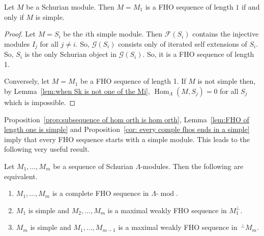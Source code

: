 \documentclass[ALCO,ThmDefs,Unicode,epreuves]{cedram}
\DeclareMathOperator{\Hom}{Hom}%
\DeclareMathOperator{\modr}{mod}
\newcommand{\cF}{\ensuremath{{\mathcal{F}}}}
\newcommand{\cG}{\ensuremath{{\mathcal{G}}}}
\begin{document}
\begin{lemm}\label{lem:FHO of length one is simple}
Let $M$ be a Schurian module. Then $M=M_1$ is a FHO sequence of length $1$ if and only if $M$ is simple.
\end{lemm}

\begin{proof}
Let $M=S_i$ be the $i$th simple module. Then $\cF(S_i)$ contains the injective modules $I_j$ for all $j\neq i$. So, $\cG(S_i)$ consists only of iterated self extensions of $S_i$. So, $S_i$ is the only Schurian object in $\cG(S_i)$. So, it is a FHO sequence of length 1.

Conversely, let $M=M_1$ be a FHO sequence of length 1. If $M$ is not simple then, by Lemma~\ref{lem:when Sk is not one of the Mi}, $\Hom_\Lambda(M,S_j)=0$ for all $S_j$ which is impossible.%
\end{proof}

Proposition~\ref{prop:subsequence of hom orth is hom orth}, Lemma~\ref{lem:FHO of length one is simple} and Proposition~\ref{cor: every comple fhos ends in a simple} imply that every FHO sequence starts with a simple module. This leads to the following very useful result.

\begin{prop}\label{prop: complete iff M1 is simple and M2, etc is maximal}
Let $M_1,\ldots,M_m$ be a sequence of Schurian $\Lambda$-modules. Then the following are equivalent.
\begin{enumerate}[(1)]
\item\label{prop2.9_1} $M_1,\ldots,M_m$ is a complete FHO sequence in $\Lambda\text{-}\modr $.

\item\label{prop2.9_2} $M_1$ is simple and $M_2,\ldots,M_m$ is a maximal weakly FHO sequence in $M_1^\perp$.

\item\label{prop2.9_3} $M_m$ is simple and $M_1,\ldots,M_{m-1}$ is a maximal weakly FHO sequence in $\,^\perp M_m$.
\end{enumerate}
\end{prop}
\end{document}
